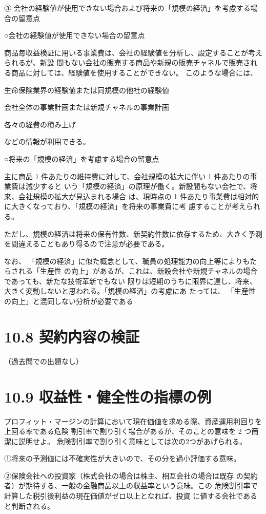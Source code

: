 \documentclass[report,gutter=10mm,fore-edge=10mm,uplatex,dvipdfmx]{jlreq}
\begin{document}
③ 会社の経験値が使用できない場合および将来の「規模の経済」を考慮する場合の留意点

○会社の経験値が使用できない場合の留意点

商品毎収益検証に用いる事業費は、会社の経験値を分析し、設定することが考えられるが、新設
間もない会社の販売する商品や新規の販売チャネルで販売される商品に対しては、経験値を使用することができない。
このような場合には、

生命保険業界の経験値または同規模の他社の経験値

会社全体の事業計画または新規チャネルの事業計画

各々の経費の積み上げ

などの情報が利用できる。

○将来の「規模の経済」を考慮する場合の留意点

主に商品 1 件あたりの維持費に対して、会社規模の拡大に伴い 1 件あたりの事業費は減少すると
いう「規模の経済」の原理が働く。新設間もない会社で、将来、会社規模の拡大が見込まれる場合
は、現時点の 1 件あたり事業費は相対的に大きくなっており、「規模の経済」を将来の事業費に考
慮することが考えられる。

ただし、規模の経済は将来の保有件数、新契約件数に依存するため、大きく予測を間違えることもあり得るので注意が必要である。

なお、
「規模の経済」に似た概念として、職員の処理能力の向上等によりもたらされる「生産性
の向上」があるが、これは、新設会社や新規チャネルの場合であっても、新たな技術革新でもない
限りは短期のうちに限界に達し、将来、大きく変動しないと思われる。「規模の経済」の考慮にあ
たっては、
「生産性の向上」と混同しない分析が必要である


\section{10.8 契約内容の検証}
（過去問での出題なし）
\section{10.9 収益性・健全性の指標の例}

プロフィット・マージンの計算において現在価値を求める際、資産運用利回りを上回る率である危険
割引率で割り引く場合があるが、そのことの意味を 2 つ簡潔に説明せよ。
\answer{}
危険割引率で割り引く意味としては次の2つがあげられる。

①将来の予測値には不確実性が大きいので、その分を過小評価する意味。

②保険会社への投資家（株式会社の場合は株主、相互会社の場合は既存
の契約者）が期待する、一般の金融商品以上の収益率という意味。この
危険割引率で計算した税引後利益の現在価値がゼロ以上となれば、投資
に値する会社であると判断される。
\end{document}
